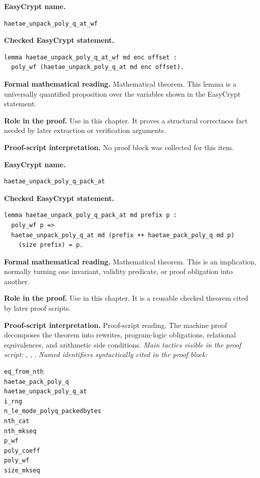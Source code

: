 \begin{formaltheorem}
\noindent\textbf{EasyCrypt name.}
\begin{lstlisting}[language=EasyCrypt,basicstyle=\ttfamily\scriptsize]
haetae_unpack_poly_q_at_wf
\end{lstlisting}
\noindent\textbf{Checked EasyCrypt statement.}
\begin{lstlisting}[language=EasyCrypt,basicstyle=\ttfamily\scriptsize]
lemma haetae_unpack_poly_q_at_wf md enc offset :
  poly_wf (haetae_unpack_poly_q_at md enc offset).
\end{lstlisting}
\noindent\textbf{Formal mathematical reading.}
Mathematical theorem. This lemma is a universally quantified proposition over the variables shown in the EasyCrypt statement.

\noindent\textbf{Role in the proof.}
Use in this chapter. It proves a structural correctness fact needed by later extraction or verification arguments.

\noindent\textbf{Proof-script interpretation.}
No proof block was collected for this item.

\end{formaltheorem}

\begin{formaltheorem}
\noindent\textbf{EasyCrypt name.}
\begin{lstlisting}[language=EasyCrypt,basicstyle=\ttfamily\scriptsize]
haetae_unpack_poly_q_pack_at
\end{lstlisting}
\noindent\textbf{Checked EasyCrypt statement.}
\begin{lstlisting}[language=EasyCrypt,basicstyle=\ttfamily\scriptsize]
lemma haetae_unpack_poly_q_pack_at md prefix p :
  poly_wf p =>
  haetae_unpack_poly_q_at md (prefix ++ haetae_pack_poly_q md p)
    (size prefix) = p.
\end{lstlisting}
\noindent\textbf{Formal mathematical reading.}
Mathematical theorem. This is an implication, normally turning one invariant, validity predicate, or proof obligation into another.

\noindent\textbf{Role in the proof.}
Use in this chapter. It is a reusable checked theorem cited by later proof scripts.

\noindent\textbf{Proof-script interpretation.}
Proof-script reading. The machine proof decomposes the theorem into rewrites, program-logic obligations, relational equivalences, and arithmetic side conditions.
\emph{Main tactics visible in the proof script:} , , .
\emph{Named identifiers syntactically cited in the proof block:}
\begin{lstlisting}[language=EasyCrypt,basicstyle=\ttfamily\scriptsize]
eq_from_nth
haetae_pack_poly_q
haetae_unpack_poly_q_at
i_rng
n_le_mode_polyq_packedbytes
nth_cat
nth_mkseq
p_wf
poly_coeff
poly_wf
size_mkseq
\end{lstlisting}

\end{formaltheorem}

